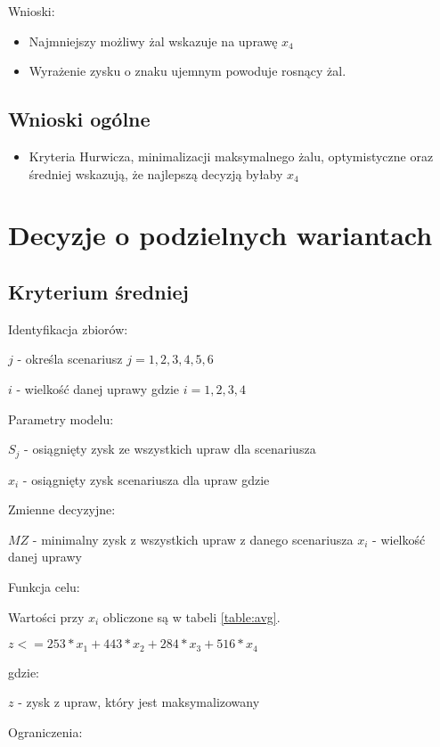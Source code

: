 \documentclass{article}
\begin{document}
Wnioski:

\begin{itemize}
  \item Najmniejszy możliwy żal wskazuje na uprawę $x_4$
  \item Wyrażenie zysku o znaku ujemnym powoduje rosnący żal.
\end{itemize}

\subsection{Wnioski ogólne}

\begin{itemize}
  \item Kryteria Hurwicza, minimalizacji maksymalnego żalu, optymistyczne oraz średniej wskazują, że najlepszą decyzją byłaby $x_4$
\end{itemize}




\section{Decyzje o podzielnych wariantach}

\subsection{Kryterium średniej}

\noindent
Identyfikacja zbiorów:

$j$ - określa scenariusz $j = {1,2,3,4,5,6}$

$i$ - wielkość danej uprawy gdzie $i = {1,2,3,4}$

\noindent
Parametry modelu:

$S_j$ - osiągnięty zysk ze wszystkich upraw dla scenariusza

$x_i$ - osiągnięty zysk scenariusza dla upraw gdzie

\noindent
Zmienne decyzyjne:

$MZ$ - minimalny zysk z wszystkich upraw z danego scenariusza
$x_i$ - wielkość danej uprawy

\noindent
Funkcja celu:

Wartości przy $x_i$ obliczone są w tabeli \ref{table:avg}.

$z <= 253 * x_1 + 443 * x_2 + 284 * x_3 + 516 * x_4$ 

gdzie:

$z$ - zysk z upraw, który jest maksymalizowany

\noindent
Ograniczenia:
\end{document}
